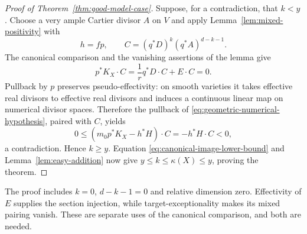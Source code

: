 \begin{proof}[Proof of Theorem~\ref{thm:good-model-case}]
Suppose, for a contradiction, that $k<y$. Choose a very ample
Cartier divisor $A$ on $V$ and apply
Lemma~\ref{lem:mixed-positivity} with
\[
 h=fp,\qquad C=(q^*D)^k(q^*A)^{d-k-1}.
\]
The canonical comparison and the vanishing assertions of the lemma
give
\begin{equation}\label{eq:canonical-test-zero}
 p^*K_X\cdot C
 =\frac1r q^*D\cdot C+E\cdot C=0.
\end{equation}
Pullback by $p$ preserves pseudo-effectivity: on smooth varieties
it takes effective real divisors to effective real divisors and
induces a continuous linear map on numerical divisor spaces.
Therefore the pullback of
\eqref{eq:geometric-numerical-hypothesis}, paired with $C$, yields
\[
 0\leq(m_0p^*K_X-h^*H)\cdot C=-h^*H\cdot C<0,
\]
a contradiction. Hence $k\geq y$. Equation
\eqref{eq:canonical-image-lower-bound} and
Lemma~\ref{lem:easy-addition} now give
$y\leq k\leq\kappa(X)\leq y$, proving the theorem.
\end{proof}

The proof includes $k=0$, $d-k-1=0$ and relative dimension zero.
Effectivity of $E$ supplies the section injection, while
target-exceptionality makes its mixed pairing vanish. These are
separate uses of the canonical comparison, and both are needed.
